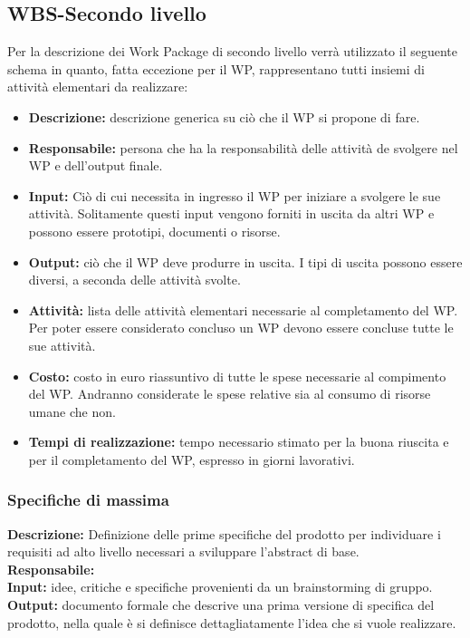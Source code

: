 \subsection {WBS-Secondo livello}

Per la descrizione dei Work Package di secondo livello verrà utilizzato il seguente schema
in quanto, fatta eccezione per il WP, rappresentano tutti insiemi di attività
elementari da realizzare:
\begin{itemize}

\item \textbf{Descrizione:} descrizione generica su ciò che il WP si propone di fare.

\item \textbf{Responsabile:} persona che ha la responsabilità delle attività de svolgere nel WP
e dell’output finale.

\item \textbf{Input:} Ciò di cui necessita in ingresso il WP per iniziare a svolgere le sue attività.
Solitamente questi input vengono forniti in uscita da altri WP e possono essere
prototipi, documenti o risorse.

\item \textbf{Output:} ciò che il WP deve produrre in uscita. I tipi di uscita possono essere
diversi, a seconda delle attività svolte.

\item \textbf{Attività:} lista delle attività elementari necessarie al completamento del WP.
Per poter essere considerato concluso un WP devono essere concluse tutte le sue
attività.

\item \textbf{Costo:} costo in euro riassuntivo di tutte le spese necessarie al compimento del
WP. Andranno considerate le spese relative sia al consumo di risorse umane che
non.

\item \textbf{Tempi di realizzazione:} tempo necessario stimato per la buona riuscita e per il completamento del WP, espresso in giorni lavorativi.
\end{itemize}




\subsubsection{Specifiche di massima}

\textbf{Descrizione:} Definizione delle prime specifiche del prodotto per individuare i requisiti
ad alto livello necessari a sviluppare l’abstract di base.\\
\linebreak
\textbf{Responsabile:} \\
\linebreak
\textbf{Input:} idee, critiche e specifiche provenienti da un brainstorming di gruppo. \\
\linebreak
\textbf{Output:} documento formale che descrive una prima versione di specifica del prodotto,
nella quale è si definisce dettagliatamente l’idea che si vuole realizzare.\\
\linebreak

